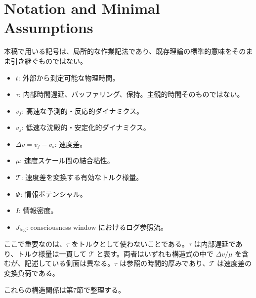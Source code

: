 \section{Notation and Minimal Assumptions}


本稿で用いる記号は、局所的な作業記法であり、既存理論の標準的意味をそのまま引き継ぐものではない。

\begin{itemize}
\item $t$: 外部から測定可能な物理時間。
\item $\tau$: 内部時間遅延、バッファリング、保持。主観的時間そのものではない。
\item $v_f$: 高速な予測的・反応的ダイナミクス。
\item $v_s$: 低速な沈殿的・安定化的ダイナミクス。
\item $\Delta v = v_f - v_s$: 速度差。
\item $\mu$: 速度スケール間の結合粘性。
\item $\mathcal{T}$: 速度差を変換する有効なトルク様量。
\item $\Phi$: 情報ポテンシャル。
\item $I$: 情報密度。
\item $J_{\log}$: consciousness window におけるログ参照流。
\end{itemize}

ここで重要なのは、$\tau$ をトルクとして使わないことである。$\tau$ は内部遅延であり、トルク様量は一貫して $\mathcal{T}$ と表す。両者はいずれも構造式の中で $\Delta v/\mu$ を含むが、記述している側面は異なる。$\tau$ は参照の時間的厚みであり、$\mathcal{T}$ は速度差の変換負荷である。

これらの構造関係は第7節で整理する。
